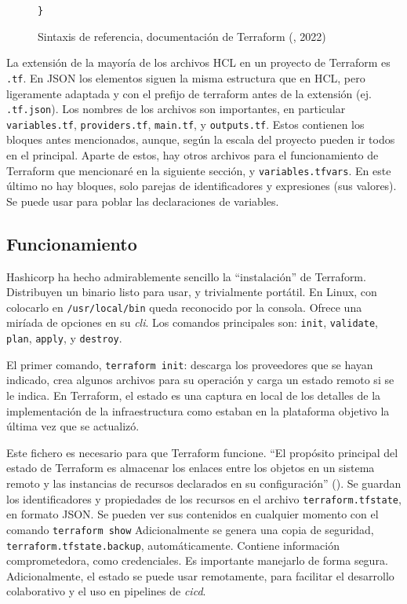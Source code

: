 \documentclass[11pt]{article}
\begin{document}
\begin{flushleft}
\begin{figure}[htb]
		\hspace{3.5cm}		
		\texttt{\}}
		\caption{Sintaxis de referencia, documentación de Terraform (\cite{hashicorp_lang1}, 2022)}
	\end{figure}
	

La extensión de la mayoría de los archivos HCL en un proyecto de Terraform es \texttt{.tf}. En JSON los elementos siguen la misma estructura que en HCL, pero ligeramente adaptada y con el prefijo de terraform antes de la extensión (ej. \texttt{.tf.json}). Los nombres de los archivos son importantes, en particular \texttt{variables.tf}, \texttt{providers.tf}, \texttt{main.tf}, y \texttt{outputs.tf}. Estos contienen los bloques antes mencionados, aunque, según la escala del proyecto pueden ir todos en el principal. Aparte de estos, hay otros archivos para el funcionamiento de Terraform que mencionaré en la siguiente sección, y \texttt{variables.tfvars}. En este último no hay bloques, solo parejas de identificadores y expresiones (sus valores). Se puede usar para poblar las declaraciones de variables.






	\clearpage
	\subsection{Funcionamiento}
		Hashicorp ha hecho admirablemente sencillo la ``instalación'' de Terraform. Distribuyen un binario listo para usar, y trivialmente portátil. En Linux, con colocarlo en \texttt{/usr/local/bin} queda reconocido por la consola. Ofrece una miríada de opciones en su \textit{\acrshort{cli}}. Los comandos principales son: \texttt{init}, \texttt{validate}, \texttt{plan}, \texttt{apply}, y \texttt{destroy}. 
		\linebreak
		
		El primer comando, \texttt{terraform init}: descarga los proveedores que se hayan indicado, crea algunos archivos para su operación y carga un estado remoto si se le indica. En Terraform, el estado es una captura en local de los detalles de la implementación de la infraestructura como estaban en la plataforma objetivo la última vez que se actualizó. 
		\linebreak
		
		Este fichero es necesario para que Terraform funcione. ``El propósito principal del estado de Terraform es almacenar los enlaces entre los objetos en un sistema remoto y las instancias de recursos declarados en su configuración'' (\cite{hashicorp_state}). Se guardan los identificadores y propiedades de los recursos en el archivo \texttt{terraform.tfstate}, en formato JSON. Se pueden ver sus contenidos en cualquier momento con el comando \texttt{terraform show} Adicionalmente se genera una copia de seguridad, \texttt{terraform.tfstate.backup}, automáticamente. Contiene información comprometedora, como credenciales. Es importante manejarlo de forma segura. Adicionalmente, el estado se puede usar remotamente, para facilitar el desarrollo colaborativo y el uso en pipelines de \textit{\acrshort{cicd}}. 
		\linebreak
		

\end{flushleft}
\end{document}

